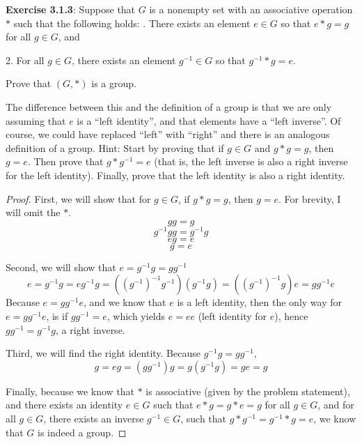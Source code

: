 \documentclass[a4paper]{article}
\begin{document}
\begin{myparindent}{0pt}
\textbf{Exercise 3.1.3}:
Suppose that $G$ is a nonempty set with an associative operation $*$ such that
the following holds: . There exists an element $e \in G$ so that $e * g = g$ for all $g \in G$, and

2. For all $g \in G$, there exists an element $g^{-1} \in G$ so that
$g^{-1} * g = e$.

Prove that $(G, *)$ is a group. \newline

The difference between this and the definition of a group is that we are only
assuming that $e$ is a “left identity”, and that elements have a “left inverse”.
Of course, we could have replaced “left” with “right” and there is an analogous
definition of a group. Hint: Start by proving that if $g \in G$ and
$g * g = g$, then $g = e$. Then prove that $g * g^{-1} = e$ (that is, the left
inverse is also a right inverse for the left identity). Finally, prove that the
left identity is also a right identity. \newline

\begin{proof}
  First, we will show that for $g \in G$, if $g * g = g$, then $g = e$. For
  brevity, I will omit the $*$.
  \[ gg = g \]
  \[ g^{-1}gg = g^{-1} g \]
  \[ eg = e \]
  \[ g = e \]

  Second, we will show that $e = g^{-1}g = gg^{-1}$
  \[ e = g^{-1}g = eg^{-1}g = (({g^{-1}})^{-1}g^{-1}) (g^{-1}g) = (({g^{-1}})^{-1}g) e = gg^{-1}e \]
  Because $e = gg^{-1}e$, and we know that $e$ is a left identity, then the only
  way for $e = gg^{-1}e$, is if $gg^{-1} = e$, which yields $e = ee$ (left identity for $e$), hence $gg^{-1} = g^{-1}g$,
  a right inverse. \newline

  Third, we will find the right identity. Because $g^{-1}g = gg^{-1}$,
  \[ g = eg = (gg^{-1})g = g(g^{-1}g) = ge = g \]

  Finally, because we know that $*$ is associative (given by the problem
  statement), and there exists an identity $e \in G$ such that
  $e * g = g * e = g$ for all $g \in G$, and for all $g \in G$, there exists
  an inverse $g^{-1} \in G$, such that $g * g^{-1} = g^{-1} * g = e$, we know
  that $G$ is indeed a group.
\end{proof}

\end{myparindent}
\end{document}
